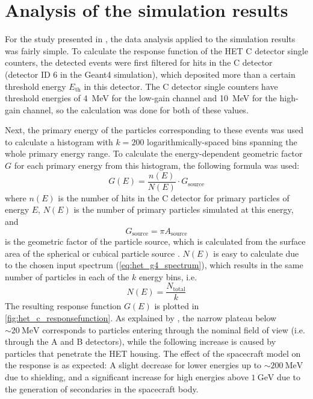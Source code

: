 \section{Analysis of the simulation results}
\label{sec:het_sim_analysis}

For the study presented in \citet{Forstner-2021-SolO}, the data analysis applied to the simulation results was fairly simple. To calculate the response function of the \ac{HET} C detector single counters, the detected events were first filtered for hits in the C detector (detector ID 6 in the \ac{Geant4} simulation), which deposited more than a certain threshold energy $E_\text{th}$ in this detector. The C detector single counters have threshold energies of \SI{4}{\mega\electronvolt} for the low-gain channel and \SI{10}{\mega\electronvolt} for the high-gain channel, so the calculation was done for both of these values.

Next, the primary energy of the particles corresponding to these events was used to calculate a histogram with $k=200$ logarithmically-spaced bins spanning the whole primary energy range. To calculate the energy-dependent geometric factor $G$ for each primary energy from this histogram, the following formula \citep[based on][equation 18]{Sullivan-1971} was used:
\begin{equation}
G(E) = \frac{n(E)}{N(E)} \cdot G_\text{source}
\end{equation}
where $n(E)$ is the number of hits in the C detector for primary particles of energy $E$, $N(E)$ is the number of primary particles simulated at this energy, and
\begin{equation}
G_\text{source} = \pi A_\text{source}
\end{equation}
is the geometric factor of the particle source, which is calculated from the surface area of the spherical or cubical particle source \citep[equation 6]{Sullivan-1971}. $N(E)$ is easy to calculate due to the chosen input spectrum (\autoref{eq:het_g4_spectrum}), which results in the same number of particles in each of the $k$ energy bins, i.e.
\begin{equation}
N(E) = \frac{N_\text{total}}{k}
\end{equation}
The resulting response function $G(E)$ is plotted in \autoref{fig:het_c_responsefunction}. As explained by \citet[Section 2.1]{Forstner-2021-SolO}, the narrow plateau below $\sim\SI{20}{\mega\electronvolt}$ corresponds to particles entering through the nominal field of view (i.e. through the A and B detectors), while the following increase is caused by particles that penetrate the \ac{HET} housing. The effect of the spacecraft model on the response is as expected: A slight decrease for lower energies up to $\sim\SI{200}{\mega\electronvolt}$ due to shielding, and a significant increase for high energies above $\SI{1}{\giga\electronvolt}$ due to the generation of secondaries in the spacecraft body.

